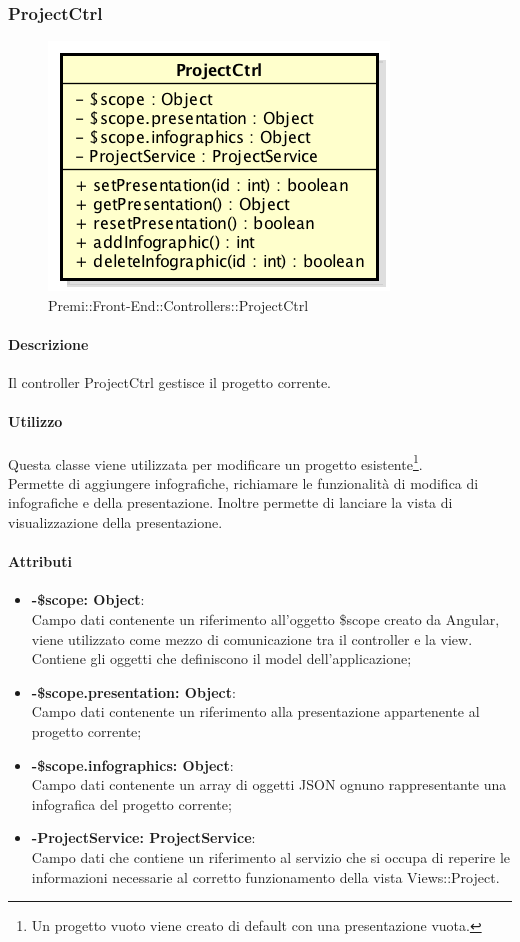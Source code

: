 \newpage


\subsubsection{ProjectCtrl}
\begin{figure}[h]
	\centering
	\includegraphics[width=0.4\linewidth]{img/premi_front_end_controllers_projectctrl}
	\caption[Premi::Front-End::Controllers::ProjectCtrl]{Premi::Front-End::Controllers::ProjectCtrl}
\end{figure}
	\paragraph{Descrizione}
	Il controller ProjectCtrl gestisce il progetto corrente.
	
	\paragraph{Utilizzo}
	Questa classe viene utilizzata per modificare un progetto esistente\footnote{Un progetto vuoto viene creato di default con una presentazione vuota.}.\\
	Permette di aggiungere infografiche, richiamare le funzionalità di modifica di infografiche e della presentazione. Inoltre permette di lanciare la vista di visualizzazione della presentazione.
	\paragraph{Attributi}
	\begin{itemize}
		\item \textbf{-\$scope: Object}:\\
			Campo dati contenente un riferimento all'oggetto \$scope creato da Angular, viene utilizzato come mezzo di comunicazione tra il controller e la view. Contiene gli oggetti che definiscono il model dell'applicazione;
		\item \textbf{-\$scope.presentation: Object}:\\
			Campo dati contenente un riferimento alla presentazione appartenente al progetto corrente;
		\item \textbf{-\$scope.infographics: Object}:\\
			Campo dati contenente un array di oggetti JSON ognuno rappresentante una infografica del progetto corrente;	
		\item \textbf{-ProjectService: ProjectService}:\\
			Campo dati che contiene un riferimento al servizio che si occupa di reperire le informazioni necessarie al corretto funzionamento della vista Views::Project.
	\end{itemize}
	
